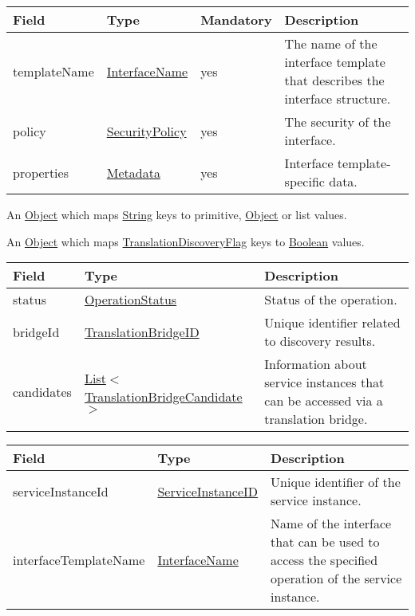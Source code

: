 \documentclass[a4paper]{arrowhead}
\newcommand{\pref}[1]{{\textcolor{ArrowheadGrey}{\hyperref[sec:model:primitives:#1]{#1}}}}
\begin{document}
\begin{table}[ht!]
\begin{tabularx}{\textwidth}{| p{3.9cm} | p{4cm} | p{2cm} | X |} \hline
\rowcolor{gray!33} Field & Type & Mandatory & Description \\ \hline
templateName & \pref{InterfaceName} & yes & The name of the interface template that describes the interface structure. \\ \hline
policy & \pref{SecurityPolicy} & yes & The security of the interface. \\ \hline
properties &\hyperref[sec:model:Metadata]{Metadata} & yes & Interface template-specific data. \\ \hline
\end{tabularx}
\end{table}


An \pref{Object} which maps \pref{String} keys to primitive, \pref{Object} or list values.


An \pref{Object} which maps \pref{TranslationDiscoveryFlag} keys to \pref{Boolean} values.

\clearpage


\begin{table}[ht!]
\begin{tabularx}{\textwidth}{| p{4.25cm} | p{6.1cm} | X |} \hline
\rowcolor{gray!33} Field & Type      & Description \\ \hline
status & \pref{OperationStatus} & Status of the operation. \\ \hline
bridgeId & \pref{TranslationBridgeID} & Unique identifier related to discovery results. \\ \hline
candidates & \pref{List}$<$\hyperref[sec:model:TranslationBridgeCandidate]{TranslationBridgeCandidate}$>$ & Information about service instances that can be accessed via a translation bridge. \\ \hline
\end{tabularx}
\end{table}


\begin{table}[ht!]
\begin{tabularx}{\textwidth}{| p{4.25cm} | p{6.1cm} | X |} \hline
\rowcolor{gray!33} Field & Type      & Description \\ \hline
serviceInstanceId & \pref{ServiceInstanceID} & Unique identifier of the service ins\-tance. \\ \hline
interfaceTemplateName & \pref{InterfaceName} & Name of the interface that can be used to access the specified operation of the service instance. \\ \hline
\end{tabularx}
\end{table}
\end{document}
